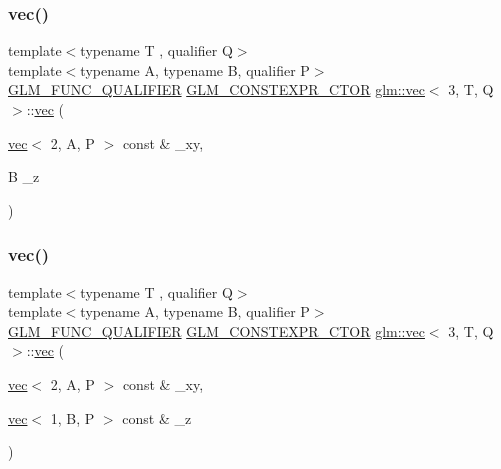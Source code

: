 \mbox{\label{structglm_1_1vec_3_013_00_01_t_00_01_q_01_4_a611e956498c0d144b8ba94638e86fca9}} 
\subsubsection{\texorpdfstring{vec()}{vec()}\hspace{0.1cm}{\footnotesize\ttfamily [18/23]}}
{\footnotesize\ttfamily template$<$typename T , qualifier Q$>$ \\
template$<$typename A, typename B, qualifier P$>$ \\
\hyperlink{setup_8hpp_a33fdea6f91c5f834105f7415e2a64407}{G\+L\+M\+\_\+\+F\+U\+N\+C\+\_\+\+Q\+U\+A\+L\+I\+F\+I\+ER} \hyperlink{setup_8hpp_ad34178a09666081abdb573c14d1f4a5a}{G\+L\+M\+\_\+\+C\+O\+N\+S\+T\+E\+X\+P\+R\+\_\+\+C\+T\+OR} \hyperlink{structglm_1_1vec}{glm\+::vec}$<$ 3, T, Q $>$\+::\hyperlink{structglm_1_1vec}{vec} (\begin{DoxyParamCaption}\item[{\hyperlink{structglm_1_1vec}{vec}$<$ 2, A, P $>$ const \&}]{\+\_\+xy,  }\item[{B}]{\+\_\+z }\end{DoxyParamCaption})}

\mbox{\label{structglm_1_1vec_3_013_00_01_t_00_01_q_01_4_ae95dab82b1cb879409d72da36d6c6005}} 
\subsubsection{\texorpdfstring{vec()}{vec()}\hspace{0.1cm}{\footnotesize\ttfamily [19/23]}}
{\footnotesize\ttfamily template$<$typename T , qualifier Q$>$ \\
template$<$typename A, typename B, qualifier P$>$ \\
\hyperlink{setup_8hpp_a33fdea6f91c5f834105f7415e2a64407}{G\+L\+M\+\_\+\+F\+U\+N\+C\+\_\+\+Q\+U\+A\+L\+I\+F\+I\+ER} \hyperlink{setup_8hpp_ad34178a09666081abdb573c14d1f4a5a}{G\+L\+M\+\_\+\+C\+O\+N\+S\+T\+E\+X\+P\+R\+\_\+\+C\+T\+OR} \hyperlink{structglm_1_1vec}{glm\+::vec}$<$ 3, T, Q $>$\+::\hyperlink{structglm_1_1vec}{vec} (\begin{DoxyParamCaption}\item[{\hyperlink{structglm_1_1vec}{vec}$<$ 2, A, P $>$ const \&}]{\+\_\+xy,  }\item[{\hyperlink{structglm_1_1vec}{vec}$<$ 1, B, P $>$ const \&}]{\+\_\+z }\end{DoxyParamCaption})}

